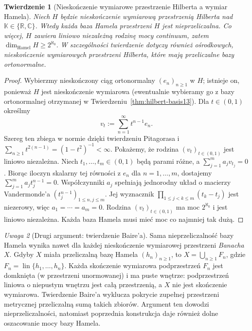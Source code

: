 \documentclass[11pt,a4paper]{article}
\numberwithin{equation}{section}
\theoremstyle{plain}
\newtheorem{twierdzenie}{Twierdzenie}[section]
\theoremstyle{definition}
\theoremstyle{remark}
\newtheorem{uwaga}[twierdzenie]{Uwaga}
\newcommand{\R}{\mathbb R}
\newcommand{\C}{\mathbb C}
\newcommand{\K}{\mathbb K}
\DeclareMathOperator{\lin}{lin}
\begin{document}
\begin{twierdzenie}[Nieskończenie wymiarowe przestrzenie Hilberta a wymiar Hamela]
\label{thm:hilbert-hamel-uncountable13}
Niech $H$ będzie nieskończenie wymiarową przestrzenią Hilberta
nad $\K\in\{\R,\C\}$. Wtedy każda baza Hamela przestrzeni $H$
jest nieprzeliczalna. Co więcej, $H$ zawiera liniowo niezależną
rodzinę mocy continuum, zatem
$\dim_{\mathrm{Hamel}}H\ge 2^{\aleph_0}$.
W szczególności twierdzenie dotyczy również ośrodkowych,
nieskończenie wymiarowych przestrzeni Hilberta, które mają
przeliczalne bazy ortonormalne.
\end{twierdzenie}
\begin{proof}
Wybierzmy nieskończony ciąg ortonormalny $(e_n)_{n\ge1}$
w $H$; istnieje on, ponieważ $H$ jest nieskończenie wymiarowa
(ewentualnie wybieramy go z bazy ortonormalnej otrzymanej
w Twierdzeniu~\ref{thm:hilbert-basis13}). Dla $t\in(0,1)$
określmy
\[
 v_t:=\sum_{n=1}^{\infty}t^{n-1}e_n.
\]
Szereg ten zbiega w normie dzięki twierdzeniu Pitagorasa i
$\sum_{n\ge1}t^{2(n-1)}=(1-t^2)^{-1}<\infty$.
Pokażemy, że rodzina $(v_t)_{t\in(0,1)}$ jest liniowo niezależna.
Niech $t_1,\ldots,t_m\in(0,1)$ będą parami różne, a
$\sum_{j=1}^m a_jv_{t_j}=0$. Biorąc iloczyn skalarny tej
równości z $e_n$ dla $n=1,\ldots,m$, dostajemy
$\sum_{j=1}^m a_jt_j^{n-1}=0$. Współczynniki $a_j$
spełniają jednorodny układ o macierzy Vandermonde'a
$(t_j^{n-1})_{1\le n,j\le m}$. Jej wyznacznik
$\prod_{1\le j<k\le m}(t_k-t_j)$ jest niezerowy, więc
$a_1=\cdots=a_m=0$. Rodzina $(v_t)_{t\in(0,1)}$ ma moc
$2^{\aleph_0}$ i jest liniowo niezależna. Każda baza Hamela
musi mieć moc co najmniej tak dużą.
\end{proof}

\begin{uwaga}[Drugi argument: twierdzenie Baire'a]
\label{rem:hilbert-hamel-baire13}
Sama nieprzeliczalność bazy Hamela wynika nawet dla każdej
nieskończenie wymiarowej przestrzeni \emph{Banacha} $X$.
Gdyby $X$ miała przeliczalną bazę Hamela $(h_n)_{n\ge1}$,
to $X=\bigcup_{n\ge1}F_n$, gdzie
$F_n=\lin\{h_1,\ldots,h_n\}$. Każda skończenie wymiarowa
podprzestrzeń $F_n$ jest domknięta (w przestrzeni unormowanej)
i ma puste wnętrze: podprzestrzeń liniowa o niepustym wnętrzu
jest całą przestrzenią, a $X$ nie jest skończenie wymiarowa.
Twierdzenie Baire'a wyklucza pokrycie zupełnej przestrzeni
metrycznej przeliczalną sumą takich zbiorów.
Argument ten dowodzi nieprzeliczalności, natomiast poprzednia
konstrukcja daje również dolne oszacowanie mocy bazy Hamela.
\end{uwaga}
\end{document}
